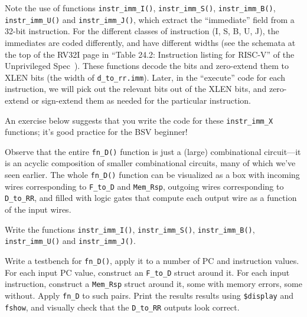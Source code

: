 Note the use of functions \verb|instr_imm_I()|, \verb|instr_imm_S()|,
\verb|instr_imm_B()|, \verb|instr_imm_U()| and \verb|instr_imm_J()|,
which extract the ``immediate'' field from a 32-bit instruction.  For
the different classes of instruction (I, S, B, U, J), the immediates
are coded differently, and have different widths (see the schemata at
the top of the RV32I page in ``Table 24.2: Instruction listing for
RISC-V'' of the Unprivileged Spec~\cite{RISCV_Unpriv_2019_12_13}).
These functions decode the bits and zero-extend them to XLEN bits (the
width of \verb|d_to_rr.imm|).  Later, in the ``execute'' code for each
instruction, we will pick out the relevant bits out of the XLEN bits,
and zero-extend or sign-extend them as needed for the particular
instruction.

An exercise below suggests that you write the code for these
\verb|instr_imm_X| functions; it's good practice for the BSV beginner!

Observe that the entire \verb|fn_D()| function is just a (large)
combinational circuit---it is an acyclic composition of smaller
combinational circuits, many of which we've seen earlier.  The whole
\verb|fn_D()| function can be visualized as a box with incoming wires
corresponding to \verb|F_to_D| and \verb|Mem_Rsp|, outgoing wires
corresponding to \verb|D_to_RR|, and filled with logic gates that
compute each output wire as a function of the input wires.


\hdivider

\Exercise

Write the functions \verb|instr_imm_I()|, \verb|instr_imm_S()|,
\verb|instr_imm_B()|, \verb|instr_imm_U()| and \verb|instr_imm_J()|.

\Exercise

Write a testbench for \verb|fn_D()|, apply it to a number of PC and
instruction values.  For each input PC value, construct an
\verb|F_to_D| struct around it.  For each input instruction, construct
a \verb|Mem_Rsp| struct around it, some with memory errors, some
without.  Apply \verb|fn_D| to such pairs.  Print the results results
using \verb|$display| and \verb|fshow|, and visually check that the
\verb|D_to_RR| outputs look correct.

\Endexercise


